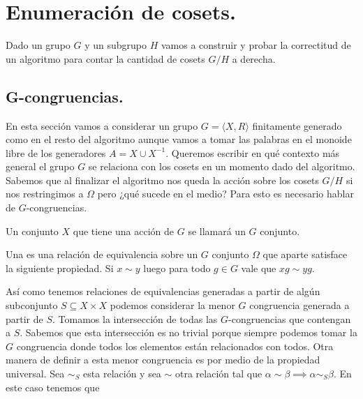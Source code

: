 \documentclass[tesis.tex]{subfiles}
\begin{document}
\chapter{Enumeración de cosets.}

Dado un grupo  $G$ y un subgrupo $H$  vamos a construir y probar la correctitud de un algoritmo para contar la cantidad de cosets $G/H$ a derecha.



\section{G-congruencias.}
En esta sección vamos a considerar un grupo $G = \langle X, R \rangle$ finitamente generado como en el resto del algoritmo aunque vamos a tomar las palabras en el monoide libre de los generadores $A = X \cup X^{-1}$.
Queremos escribir en qué contexto más general el grupo $G$ se relaciona con los cosets en un momento dado del algoritmo. 
Sabemos que al finalizar el algoritmo nos queda la acción sobre los cosets $G/H$ si nos restringimos a $\Omega$ pero ¿qué sucede en el medio?
Para esto es necesario hablar de $G$-congruencias.
\begin{deff}
    Un conjunto $X$ que tiene una acción de $G$ se llamará un $G$ conjunto.    
\end{deff}



\begin{deff}
    Una  es una relación de equivalencia sobre un $G$ conjunto $\Omega$ que aparte satisface la siguiente propiedad.
    Si $x \sim y$ luego para todo $g \in G$ vale que $xg \sim yg$.
\end{deff}

Así como tenemos relaciones de equivalencias generadas a partir de algún subconjunto $S \subseteq X \times X$ podemos considerar la menor $G$ congruencia generada a partir de $S$.
Tomamos la intersección de todas las $G$-congruencias que contengan a $S$. 
Sabemos que esta intersección es no trivial porque siempre podemos tomar la $G$ congruencia donde todos los elementos están relacionados con todos.
Otra manera de definir a esta menor congruencia es por medio de la propiedad universal.
Sea $\sim_S$ esta relación y sea $\sim$ otra relación tal que $\alpha \sim \beta \implies \alpha \sim_S \beta$. 
En este caso tenemos que
\end{document}
